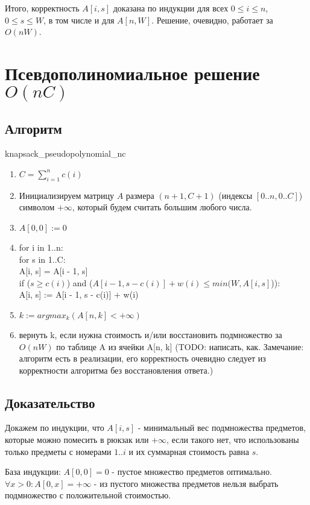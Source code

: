 \documentclass{article}
\begin{document}
	Итого, корректность $A[i, s]$ доказана по индукции для всех $ 0 \leq i \leq n$, $0 \leq s \leq W$, в том числе и для $A[n, W]$. Решение, очевидно, работает за $O(nW)$.


\section{Псевдополиномиальное решение $O(nC)$}
	\subsection{Алгоритм}
	
	knapsack\_pseudopolynomial\_nc
	\begin{enumerate}
		\item $C = \sum\limits_{i = 1}^{n} {c(i)}$
		\item Инициализируем матрицу $A$ размера $(n + 1, C + 1)$ (индексы $[0..n, 0..C]$) символом $+\infty$, который будем считать большим любого числа.
		\item $A[0, 0] := 0$
		\item for i in 1..n: \\
			for s in 1..C: \\
			A[i, s] = A[i - 1, s] \\
			if ($s \geq c(i)$) and ($A[i - 1, s - c(i)] + w(i) \leq min(W, A[i, s]$)): \\
				A[i, s] := A[i - 1, s - c(i)] + w(i)
		\item $k := argmax_{k}(A[n, k] < +\infty)$
		\item вернуть k, если нужна стоимость и/или восстановить подмножество за $O(nW)$ по таблице A из ячейки A[n, k] (TODO: написать, как. Замечание: алгоритм есть в реализации, его корректность очевидно следует из корректности алгоритма без восстановления ответа.)
			
	\end{enumerate}
	
	\subsection{Доказательство}
	
	Докажем по индукции, что $A[i, s]$ - минимальный вес подмножества предметов, которые можно помесить в рюкзак или $+\infty$, если такого нет, что использованы только предметы с номерами $1..i$ и их суммарная стоимость равна $s$.
	
	База индукции: $A[0, 0] = 0$ - пустое множество предметов оптимально.
	$\forall x > 0: A[0, x] = +\infty$ - из пустого множества предметов нельзя выбрать подмножество с положительной стоимостью.
	
\end{document}
